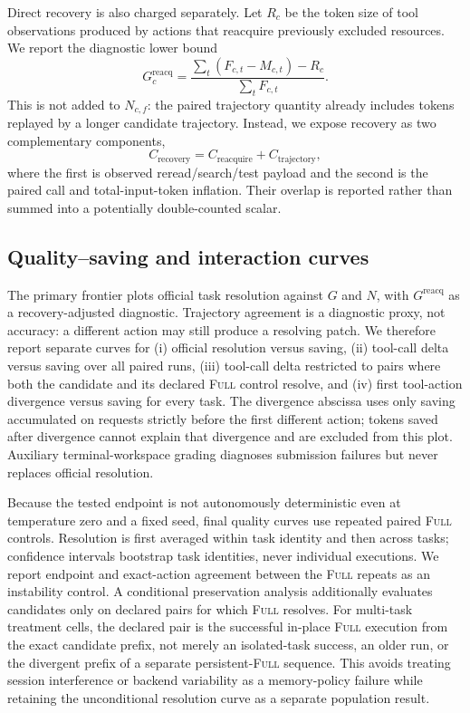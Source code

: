 \documentclass[11pt]{article}
\begin{document}
Direct recovery is also charged separately. Let $R_c$ be the token size of
tool observations produced by actions that reacquire previously excluded
resources. We report the diagnostic lower bound
\[
G^{\mathrm{reacq}}_c=
\frac{\sum_t(F_{c,t}-M_{c,t})-R_c}{\sum_tF_{c,t}}.
\]
This is not added to $N_{c,f}$: the paired trajectory quantity already includes
tokens replayed by a longer candidate trajectory. Instead, we expose recovery
as two complementary components,
\[
C_{\mathrm{recovery}}=C_{\mathrm{reacquire}}+C_{\mathrm{trajectory}},
\]
where the first is observed reread/search/test payload and the second is the
paired call and total-input-token inflation. Their overlap is reported rather
than summed into a potentially double-counted scalar.

\subsection{Quality--saving and interaction curves}

The primary frontier plots official task resolution against $G$ and $N$, with
$G^{\mathrm{reacq}}$ as a recovery-adjusted diagnostic.
Trajectory agreement is a diagnostic proxy, not accuracy: a different action
may still produce a resolving patch.  We therefore report separate curves for
(i) official resolution versus saving, (ii) tool-call delta versus saving over
all paired runs, (iii) tool-call delta restricted to pairs where both the
candidate and its declared \textsc{Full} control resolve, and (iv) first
tool-action divergence versus saving for every task. The divergence abscissa
uses only saving accumulated on requests strictly before the first different
action; tokens saved after divergence cannot explain that divergence and are
excluded from this plot.
Auxiliary terminal-workspace grading diagnoses submission failures but never
replaces official resolution.

Because the tested endpoint is not autonomously deterministic even at
temperature zero and a fixed seed, final quality curves use repeated paired
\textsc{Full} controls. Resolution is first averaged within task identity and
then across tasks; confidence intervals bootstrap task identities, never
individual executions. We report endpoint and exact-action agreement between
the \textsc{Full} repeats as an instability control. A conditional preservation
analysis additionally evaluates candidates only on declared pairs for which
\textsc{Full} resolves.  For multi-task treatment cells, the declared pair is
the successful in-place \textsc{Full} execution from the exact candidate prefix,
not merely an isolated-task success, an older run, or the divergent prefix of a
separate persistent-\textsc{Full} sequence.  This avoids treating session
interference or backend variability as a memory-policy failure while retaining
the unconditional resolution curve as a separate population result.
\end{document}
